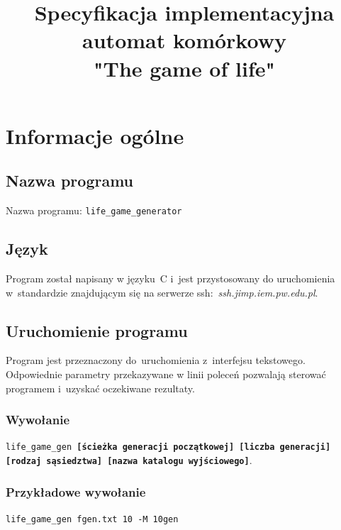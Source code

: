 \documentclass[a4paper,11pt]{article}
\author{}
\title{
	\Huge Specyfikacja implementacyjna \\
	automat komórkowy\\
	\textbf{"The game of life"}
}
\begin{document}
	\maketitle 
	\newpage
	\tableofcontents 
	\newpage
	\section {Informacje ogólne}
		\subsection{Nazwa programu}
			Nazwa programu: \texttt{life\_game\_generator}
		\subsection{Język}
			Program został napisany w języku~C i~jest przystosowany do uruchomienia w~standardzie znajdującym się na serwerze ssh:~\textit{ssh.jimp.iem.pw.edu.pl}.
		\subsection{Uruchomienie programu}
			Program jest przeznaczony do~uruchomienia z~interfejsu tekstowego. Odpowiednie parametry przekazywane w linii poleceń pozwalają sterować programem i~uzyskać oczekiwane rezultaty. 
			\subsubsection{Wywołanie}
				\texttt{life\_game\_gen \textbf{[ścieżka generacji początkowej] [liczba generacji] [rodzaj sąsiedztwa] [nazwa katalogu wyjściowego]}}.
			\subsubsection{Przykładowe wywołanie} 				
				\texttt{life\_game\_gen~fgen.txt~10~-M~10gen}
				\newpage
\end{document}
